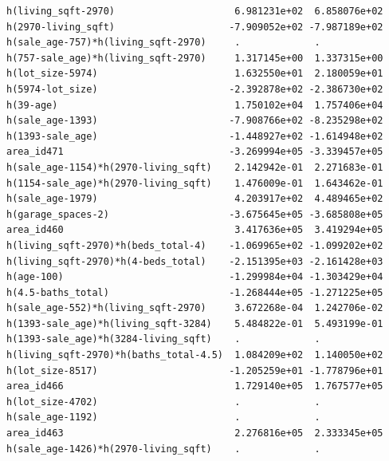\documentclass[
]{article}
\begin{document}
\begin{verbatim}
h(living_sqft-2970)                     6.981231e+02  6.858076e+02
h(2970-living_sqft)                    -7.909052e+02 -7.987189e+02
h(sale_age-757)*h(living_sqft-2970)     .             .           
h(757-sale_age)*h(living_sqft-2970)     1.317145e+00  1.337315e+00
h(lot_size-5974)                        1.632550e+01  2.180059e+01
h(5974-lot_size)                       -2.392878e+02 -2.386730e+02
h(39-age)                               1.750102e+04  1.757406e+04
h(sale_age-1393)                       -7.908766e+02 -8.235298e+02
h(1393-sale_age)                       -1.448927e+02 -1.614948e+02
area_id471                             -3.269994e+05 -3.339457e+05
h(sale_age-1154)*h(2970-living_sqft)    2.142942e-01  2.271683e-01
h(1154-sale_age)*h(2970-living_sqft)    1.476009e-01  1.643462e-01
h(sale_age-1979)                        4.203917e+02  4.489465e+02
h(garage_spaces-2)                     -3.675645e+05 -3.685808e+05
area_id460                              3.417636e+05  3.419294e+05
h(living_sqft-2970)*h(beds_total-4)    -1.069965e+02 -1.099202e+02
h(living_sqft-2970)*h(4-beds_total)    -2.151395e+03 -2.161428e+03
h(age-100)                             -1.299984e+04 -1.303429e+04
h(4.5-baths_total)                     -1.268444e+05 -1.271225e+05
h(sale_age-552)*h(living_sqft-2970)     3.672268e-04  1.242706e-02
h(1393-sale_age)*h(living_sqft-3284)    5.484822e-01  5.493199e-01
h(1393-sale_age)*h(3284-living_sqft)    .             .           
h(living_sqft-2970)*h(baths_total-4.5)  1.084209e+02  1.140050e+02
h(lot_size-8517)                       -1.205259e+01 -1.778796e+01
area_id466                              1.729140e+05  1.767577e+05
h(lot_size-4702)                        .             .           
h(sale_age-1192)                        .             .           
area_id463                              2.276816e+05  2.333345e+05
h(sale_age-1426)*h(2970-living_sqft)    .             .           
                                                                  

\end{verbatim}
\end{document}
